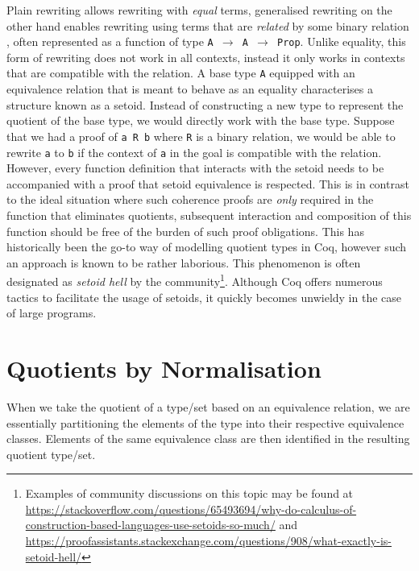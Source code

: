 \documentclass[12pt,twoside,maitrise]{dms}
\theoremstyle{definition}
\numberwithin{equation}{section}
\numberwithin{table}{chapter}
\numberwithin{figure}{chapter}
\newcommand\kw[1] {\textsf{#1}}
\newcommand\id[1] {\texttt{#1}}
\newcommand\fn[1] {\texttt{#1}}
\begin{document}
Plain rewriting allows rewriting with \emph{equal} terms, generalised
rewriting\cite{sozeau2009new, coq-gen-rewriting} on the other hand enables
rewriting using terms that are \emph{related} by some binary relation , often
represented as a function of type \fn{A $\rightarrow$ A $\rightarrow$
  \kw{Prop}}. Unlike equality, this form of rewriting does not work in all
contexts, instead it only works in contexts that are compatible with the
relation. A base type \id{A} equipped with an equivalence relation that is meant
to behave as an equality characterises a structure known as a
setoid\cite{hofmann1995simple}. Instead of constructing a new type to represent
the quotient of the base type, we would directly work with the base type.
Suppose that we had a proof of \fn{a R b} where \id{R} is a binary relation, we
would be able to rewrite \id{a} to \id{b} if the context of \id{a} in the goal
is compatible with the relation. However, every function definition that
interacts with the setoid needs to be accompanied with a proof that setoid
equivalence is respected. This is in contrast to the ideal situation where such
coherence proofs are \emph{only} required in the function that eliminates
quotients, subsequent interaction and composition of this function should be
free of the burden of such proof obligations. This has historically been the
go-to way of modelling quotient types in Coq, however such an approach is known
to be rather laborious. This phenomenon is often designated as \emph{setoid
hell} by the community\footnote{Examples of community discussions on this topic
may be found at
\url{https://stackoverflow.com/questions/65493694/why-do-calculus-of-construction-based-languages-use-setoids-so-much/}
and
\url{https://proofassistants.stackexchange.com/questions/908/what-exactly-is-setoid-hell/}}.
Although Coq offers numerous tactics to facilitate the usage of setoids, it
quickly becomes unwieldy in the case of large programs.

\section{Quotients by Normalisation}
When we take the quotient of a type/set based on an equivalence relation, we are
essentially partitioning the elements of the type into their respective
equivalence classes. Elements of the same equivalence class are then identified
in the resulting quotient type/set.
\end{document}
